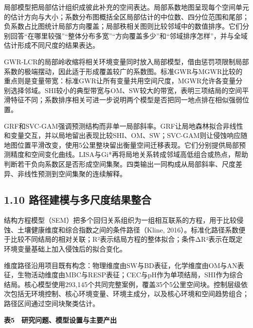 \documentclass[
  11pt,
  a4paper,
]{ctexart}
\begin{document}
局部模型把局部估计组织成彼此补充的空间表达。局部系数地图呈现每个空间单元的估计方向与大小；系数分布图概括全区局部估计的中位数、四分位范围和尾部；负系数占比图统计局部方向覆盖；局部秩相关图则比较邻域中的数值排序。它们分别回答``在哪里较强''``整体分布多宽''``方向覆盖多少''和``邻域排序怎样''，并与全域估计形成不同尺度的结果表达。

GWR-LCR的局部岭收缩将相关环境变量同时放入局部模型，借由惩罚项限制局部系数的极端摆动，因此适于形成覆盖较广的系数图。标准GWR与MGWR比较的重点则是变量带宽：标准GWR让所有变量共用空间尺度，MGWR允许各变量分别选择邻域。SHI较小的典型带宽与OM、SW较大的带宽，表明三项结局的空间平滑特征不同；系数排序相关可进一步说明两个模型是否把同一地点排在相似强弱位置。

GRF和SVC-GAM强调预测结构而非单一局部斜率。GRF让局地森林拟合非线性和变量交互，并以局地留出表现比较SHI、OM、SW；SVC-GAM则让侵蚀响应随地图位置平滑改变，使用5公里整块留出衡量空间迁移表现。它们分别提供局部预测精度和空间变化曲线。LISA与Gi*再将局地关系转成邻域高低组合或热点，帮助判断若干负向系数区是否形成空间集聚。四类输出一同构成从局部斜率、尺度差异、非线性预测到空间集聚的连续解释。

\hypertarget{ux8defux5f84ux5efaux6a21ux4e0eux591aux5c3aux5ea6ux7ed3ux679cux6574ux5408}{%
\subsection{1.10
路径建模与多尺度结果整合}\label{ux8defux5f84ux5efaux6a21ux4e0eux591aux5c3aux5ea6ux7ed3ux679cux6574ux5408}}

结构方程模型（SEM）把多个回归关系组织为一组相互联系的方程，用于比较侵蚀、土壤健康维度和综合指数之间的条件路径（Kline,
2016）。标准化路径系数便于比较不同结局的相对关联；R²表示结局方程的整体拟合；条件ΔR²表示在既定环境变量基础上加入侵蚀后的拟合变化。

维度路径沿用项目既有构念：物理维度由SW与BD表征，化学维度由OM与AN表征，生物活动维度由MBC与RESP表征；CEC与pH作为单项结局，SHI作为综合结局。核心模型使用293,145个共同完整案例，覆盖35个5公里空间块。控制层级依次包括无环境控制、核心环境变量、环境主成分，以及核心环境和空间趋势组合；路径区间通过空间块聚类估计。

\textbf{表5　研究问题、模型设置与主要产出}
\end{document}
